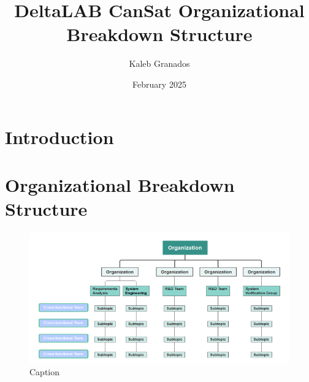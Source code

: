 \documentclass{article}
\title{DeltaLAB CanSat Organizational Breakdown Structure}
\author{Kaleb Granados}
\date{February 2025}
\begin{document}
\maketitle
\newpage

\section{Introduction}
\section{Organizational Breakdown Structure}

\begin{figure}[h!]
    \centering
    \includegraphics[width=1\linewidth]{Project Management/Project_management_Figs/OBS_1.png}
    \caption{Caption}
    \label{Preliminar Organizational Breakdown Structure Diagram}
\end{figure}
\end{document}
